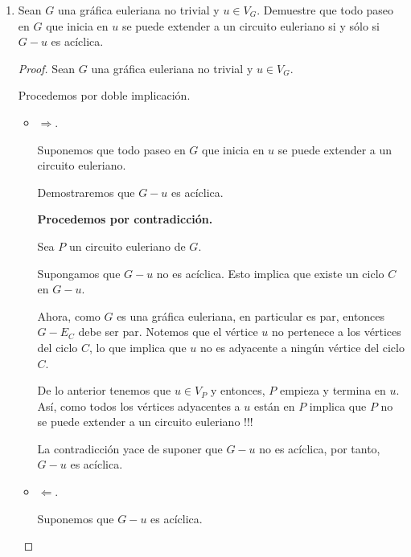 \documentclass{article}
\begin{document}
\begin{enumerate}
\begin{proof}
    Como en cualquiera de los casos anteriores hay una cantidad par de fichas, entonces podemos agrupar
    conjuntos [aristas] de orden $2$ con las fichas [vértices] y obtendremos una gráfica par, pues cada
    ficha se relacionará con exactamente $2$, luego, los ordenes $n$ en el dominó, siempre que $n$ sea
    par, forman gráficas eulerianas, luego por el teorema de caracterización de gráficas eulerianas tenemos
    que esta es un ciclo.
  \end{proof}
\item Sean $G$ una gr\'afica euleriana no trivial
  y $u \in V_G$. Demuestre que todo paseo en $G$
  que inicia en $u$ se puede extender a un circuito
  euleriano si y s\'olo si $G-u$ es ac\'iclica.

  \begin{proof}
    Sean $G$ una gr\'afica euleriana no trivial y $u \in V_{G}$.

    Procedemos por doble implicación.

    \begin{itemize}
      \item $\Longrightarrow$.

        Suponemos que todo paseo en $G$ que inicia en $u$ se puede extender a un circuito euleriano.

        Demostraremos que $G-u$ es ac\'iclica.

        \textbf{Procedemos por contradicción.}

        Sea $P$ un circuito euleriano de $G$.

        Supongamos que $G-u$ no es ac\'iclica. Esto implica que existe un ciclo $C$ en $G-u$.

        Ahora, como $G$ es una gráfica euleriana, en particular es par, entonces $G - E_{C}$ debe ser par. Notemos que el vértice $u$ no pertenece a los vértices del ciclo $C$, lo que implica que $u$ no es adyacente a ningún vértice del ciclo $C$.

        De lo anterior tenemos que $u \in V_{P}$ y entonces, $P$ empieza y termina en $u$. Así, como todos los vértices adyacentes a $u$ están en $P$ implica que $P$ no se puede extender a un circuito euleriano !!!

        La contradicción yace de suponer que $G - u$ no es acíclica, por tanto, $G - u$ es acíclica.

      \item $\Longleftarrow$.

        Suponemos que $G-u$ es ac\'iclica.


\end{itemize}
\end{proof}
\end{enumerate}
\end{document}
